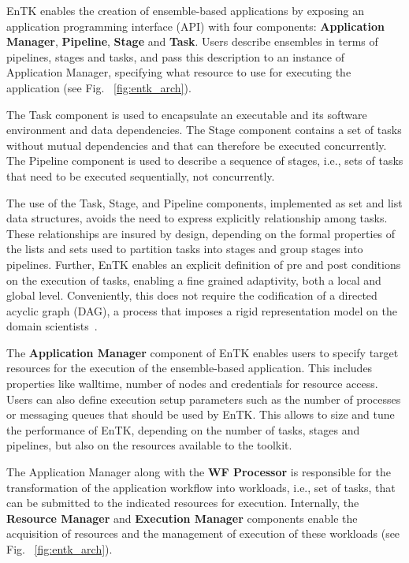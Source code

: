 \documentclass{bmcart}
\begin{document}
EnTK enables the creation of ensemble-based applications by exposing an 
application programming interface (API)
with four components: \textbf{Application Manager}, \textbf{Pipeline},
\textbf{Stage} and \textbf{Task}. Users describe ensembles in terms of
pipelines, stages and tasks, and pass this description to an instance
of Application Manager, specifying what resource to use for executing the
application (see Fig. ~\ref{fig:entk_arch}).


The Task component is used to encapsulate an executable and its software
environment and data dependencies. The Stage component contains a set of
tasks without mutual dependencies and that can therefore be executed
concurrently. The Pipeline component is used to describe a sequence of
stages, i.e., sets of tasks that need to be executed sequentially, not
concurrently.

The use of the Task, Stage, and Pipeline components, implemented as set and
list data structures, avoids the need to express explicitly relationship
among tasks. These relationships are insured by design, depending on the
formal properties of the lists and sets used to partition tasks into stages
and group stages into pipelines. Further, EnTK enables an explicit definition
of pre and post conditions on the execution of tasks, enabling a fine grained
adaptivity, both a local and global level. Conveniently, this does not
require the codification of a directed acyclic graph (DAG), a process that
imposes a rigid representation model on the domain
scientists~\cite{balasubramanian2017powerofmany}.


The \textbf{Application Manager} component of EnTK enables users to specify
target resources for the execution of the ensemble-based application. This
includes properties like walltime, number of nodes and credentials for
resource access. Users can also define execution setup parameters such as the
number of processes or messaging queues that should be used by EnTK\@. This
allows to size and tune the performance of EnTK, depending on the number of
tasks, stages and pipelines, but also on the resources available to the
toolkit.

The Application Manager along with the \textbf{WF Processor} is responsible
for the transformation of the application workflow into workloads, i.e., set
of tasks, that can be submitted to the indicated resources for execution.
Internally, the \textbf{Resource Manager} and \textbf{Execution Manager}
components enable the acquisition of resources and the management of
execution of these workloads (see Fig. ~\ref{fig:entk_arch}).
\end{document}
